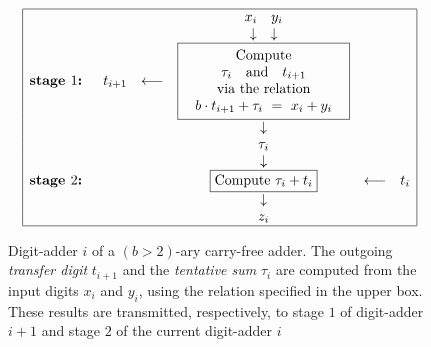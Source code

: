 \begin{figure}[hbt]
\[
\begin{array}{|llcccr|}
\hline
 & & & x_i \ \ \ y_i & & \\
 & & & \downarrow \ \ \ \downarrow  & & \\
\mbox{\bf stage $1$:   } & t_{i+1} & \longleftarrow &
\fbox{
\begin{tabular}{c}
Compute \\
$\tau_i$ \ \ and \ \ $t_{i+1}$ \\
via the relation \\
$b \cdot t_{i+1} + \tau_i \ = \ x_i + y_i$
\end{tabular}
} & & \\
  & & & \downarrow & & \\  
  & & & \tau_i & & \\
  & & & \downarrow & & \\ 
\mbox{\bf stage $2$:   } & & &  \fbox{Compute $\tau_i + t_i$} & \longleftarrow & t_i 
  \\
  & & & \downarrow & &
  \\
  & & & z_i & &
  \\
\hline
\end{array}
\]
\caption{Digit-adder $i$ of a $(b > 2)$-ary carry-free adder.  The outgoing {\it transfer digit} $t_{i+1}$ and the {\it tentative sum} $\tau_i$ are computed from the input digits $x_i$ and $y_i$, using the relation specified in the upper box.  These results are transmitted, respectively, to stage $1$ of digit-adder $i+1$ and stage $2$ of the current digit-adder $i$}
\label{fig:carry-free-digit}
\end{figure}

  

\newpage

